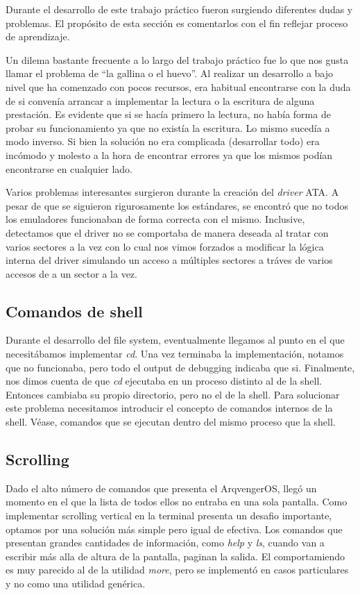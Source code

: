 \documentclass[a4paper,10pt]{article}
\begin{document}
Durante el desarrollo de este trabajo práctico fueron surgiendo diferentes dudas y problemas. El propósito de esta
sección es comentarlos con el fin reflejar proceso de aprendizaje.

Un dilema bastante frecuente a lo largo del trabajo práctico fue lo que nos gusta llamar el problema de ``la gallina o el huevo''. Al realizar
un desarrollo a bajo nivel que ha comenzado con pocos recursos, era habitual encontrarse con la duda de si convenía
arrancar a implementar la lectura o la escritura de alguna prestación. Es evidente que si se hacía primero la lectura, 
no había forma de probar su funcionamiento ya que no existía la escritura. Lo mismo sucedía a modo inverso. Si bien 
la solución no era complicada (desarrollar todo) era incómodo y molesto a la hora de encontrar errores ya que los mismos
podían encontrarse en cualquier lado.

Varios problemas interesantes surgieron durante la creación del \textit{driver} ATA. A pesar de que se siguieron
rigurosamente los estándares, se encontró que no todos los emuladores funcionaban de forma correcta con el mismo.
Inclusive, detectamos que el driver no se comportaba de manera deseada al tratar con varios sectores a la vez con lo
cual nos vimos forzados a modificar la lógica interna del driver simulando un acceso a múltiples sectores a tráves de
varios accesos de a un sector a la vez.


      \subsection{Comandos de shell}
      Durante el desarrollo del file system, eventualmente llegamos al punto en el que necesitábamos implementar \textit{cd}.
      Una vez terminaba la implementación, notamos que no funcionaba, pero todo el output de debugging indicaba que si.
      Finalmente, nos dimos cuenta de que \textit{cd} ejecutaba en un proceso distinto al de la shell.
      Entonces cambiaba su propio directorio, pero no el de la shell.
      Para solucionar este problema necesitamos introducir el concepto de comandos internos de la shell.
      Véase, comandos que se ejecutan dentro del mismo proceso que la shell.

      \subsection{Scrolling}
      Dado el alto número de comandos que presenta el ArqvengerOS, llegó un momento en el que la lista de todos ellos no entraba en una sola pantalla.
      Como implementar scrolling vertical en la terminal presenta un desafio importante, optamos por una solución más simple pero igual de efectiva.
      Los comandos que presentan grandes cantidades de información, como \textit{help} y \textit{ls}, cuando van a escribir más alla de altura de la pantalla, 
      paginan la salida.
      El comportamiendo es muy parecido al de la utilidad \textit{more}, pero se implementó en casos particulares y no como una utilidad genérica.
\end{document}
